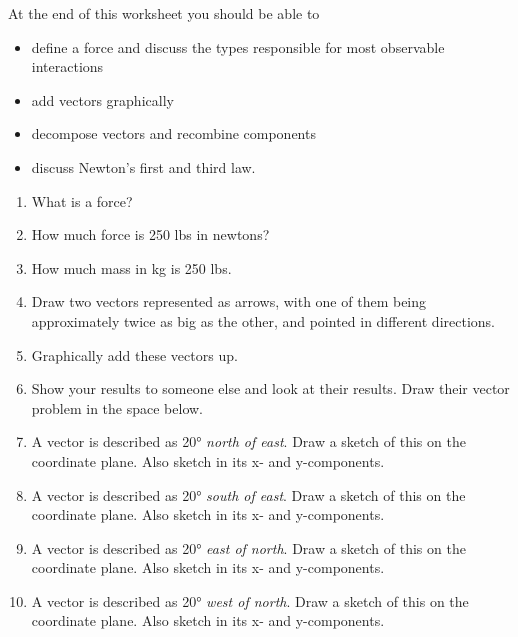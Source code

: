 At the end of this worksheet you should be able to  
\begin{itemize}
	\item define a force and discuss the types responsible for most observable interactions
	\item add vectors graphically
	\item decompose vectors and recombine components
	\item discuss Newton's first and third law.

\end{itemize}


\begin{enumerate}
\setlength\itemsep{1 in}


\item
What is a force?

\item
How much force is 250 lbs in newtons?

\item 
How much mass in kg is 250 lbs.

\item 
Draw two vectors represented as arrows, with one of them being approximately twice as big as the other, and pointed in different directions.
\hugeskip

\item 
Graphically add these vectors up.
\hugeskip	

\item Show your results to someone else and look at their results. Draw their vector problem in the space below.
\hugeskip

\item 
A vector is described as \ang{20} \emph{north of east}. Draw a sketch of this on the coordinate plane. Also sketch in its x- and y-components. 
\giantskip

\item 
A vector is described as \ang{20} \emph{south of east}. Draw a sketch of this on the coordinate plane. Also sketch in its x- and y-components. 
\giantskip

\item 
A vector is described as \ang{20} \emph{east of north}. Draw a sketch of this on the coordinate plane. Also sketch in its x- and y-components. 
\giantskip

\item 
A vector is described as \ang{20} \emph{west of north}. Draw a sketch of this on the coordinate plane. Also sketch in its x- and y-components. 
\giantskip


\end{enumerate}
